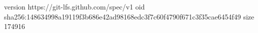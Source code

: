 version https://git-lfs.github.com/spec/v1
oid sha256:148634998a19119f3b686e42ad98168edc3f7c60f4790f671c3f35cae6454f49
size 174916
